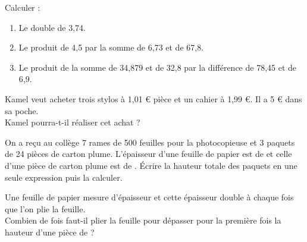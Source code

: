 \begin{colonne*exercice}
\smallskip

\begin{exercice}
   Calculer :
   \begin{enumerate}
      \item Le double de 3,74.
      \item Le produit de 4,5 par la somme de 6,73 et de 67,8.
      \item Le produit de la somme de 34,879 et de 32,8 par la différence de 78,45 et de 6,9.
   \end{enumerate}
\end{exercice}

\medskip


\begin{exercice}
   Kamel veut acheter trois stylos à 1,01 \euro{} pièce et un cahier à 1,99 \euro{}. Il a 5 \euro{} dans sa poche. \\
   Kamel pourra-t-il réaliser cet achat ?
\end{exercice}  

\smallskip
  
\begin{exercice}
   On a reçu au collège 7 rames de 500 feuilles pour la photocopieuse et 3 paquets de 24 pièces de carton plume. L'épaisseur d'une feuille de papier est de  et celle d'une pièce de carton plume est de . Écrire la hauteur totale des paquets en une seule expression puis la calculer.
\end{exercice}

\smallskip

\begin{exercice}
   Une feuille de papier mesure  d'épaisseur et cette épaisseur double à chaque fois que l'on plie la feuille. \\
   Combien de fois faut-il plier la feuille pour dépasser pour la première fois la hauteur d'une pièce de  ?
\end{exercice}

\smallskip


\end{colonne*exercice}
